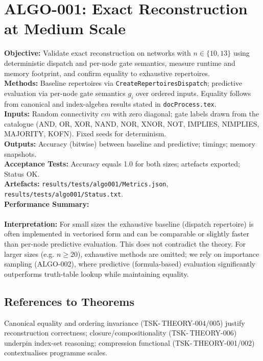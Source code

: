 \documentclass{article}
\begin{document}
\section{ALGO-001: Exact Reconstruction at Medium Scale}
\textbf{Objective:} Validate exact reconstruction on networks with \(n\in\{10,13\}\) using deterministic dispatch and per-node gate semantics, measure runtime and memory footprint, and confirm equality to exhaustive repertoires.\\
\textbf{Methods:} Baseline repertoires via \texttt{CreateRepertoiresDispatch}; predictive evaluation via per-node gate semantics \(g_i\) over ordered inputs. Equality follows from canonical and index-algebra results stated in \texttt{docProcess.tex}.\\
\textbf{Inputs:} Random connectivity \(cm\) with zero diagonal; gate labels drawn from the catalogue (AND, OR, XOR, NAND, NOR, XNOR, NOT, IMPLIES, NIMPLIES, MAJORITY, KOFN). Fixed seeds for determinism.\\
\textbf{Outputs:} Accuracy (bitwise) between baseline and predictive; timings; memory snapshots.\\
\textbf{Acceptance Tests:} Accuracy equals 1.0 for both sizes; artefacts exported; Status OK.\\
\textbf{Artefacts:} \texttt{results/tests/algo001/Metrics.json}, \texttt{results/tests/algo001/Status.txt}.
\\
\textbf{Performance Summary:}\\
\\
\textbf{Interpretation:} For small sizes the exhaustive baseline (dispatch repertoire) is often implemented in vectorised form and can be comparable or slightly faster than per-node predictive evaluation. This does not contradict the theory. For larger sizes (e.g. \(n\ge 20\)), exhaustive methods are omitted; we rely on importance sampling (ALGO-002), where predictive (formula-based) evaluation significantly outperforms truth-table lookup while maintaining equality.

\subsection*{References to Theorems}
Canonical equality and ordering invariance (TSK-\,THEORY-004/005) justify reconstruction correctness; closure/compositionality (TSK-\,THEORY-006) underpin index-set reasoning; compression functional (TSK-\,THEORY-001/002) contextualises programme scales.
\end{document}
